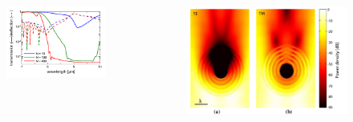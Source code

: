 \documentclass{beamer}
\begin{document}
\begin{frame}
	\begin{columns}
			\begin{column}{0.5\textwidth}
			\begin{figure}
						\includegraphics[width=\textwidth]{../images/pml/oqe_trans_refl.png}
			\end{figure}
		\end{column}
		\begin{column}{0.5\textwidth}
			\begin{figure}
						\includegraphics[width=1.1\textwidth]{../images/pml/oqe_coreshell.png}
			\end{figure}
		\end{column}

	\end{columns}
		
\end{frame}
\end{document}
